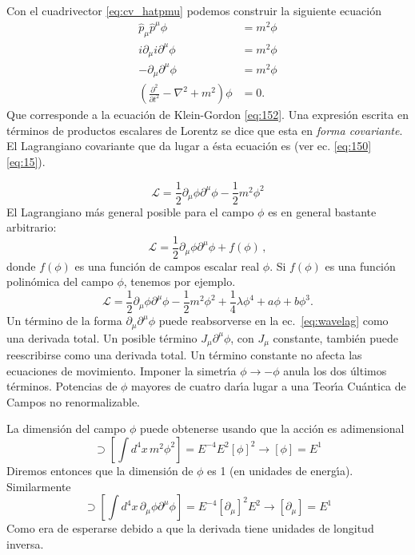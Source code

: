 Con el cuadrivector \eqref{eq:cv_hatpmu} podemos construir la
siguiente ecuaci\'on
\begin{align}
  \hat{p}_\mu\hat{p}^\mu\phi&=m^2\phi\nonumber\\
  i\partial_\mu i\partial^\mu\phi&=m^2\phi\nonumber\\
  -\partial_\mu\partial^\mu\phi&=m^2\phi\nonumber\\
  \label{eq:waveec}
  \left(\frac{\partial^2}{\partial t^2}-\nabla^2+m^2\right)\phi&=0.
\end{align}
Que corresponde a la ecuaci\'on de Klein-Gordon \eqref{eq:152}. Una expresi\'on escrita en t\'erminos de productos escalares de Lorentz se dice que esta en \emph{forma covariante}. El Lagrangiano covariante que da lugar a
\'esta ecuaci\'on es (ver ec. \eqref{eq:150}
\eqref{eq:15}). %

\begin{equation}
  \label{eq:wavelagtrue}
  \mathcal{L}=\frac{1}{2}\partial_\mu\phi\partial^\mu\phi-\frac{1}{2}m^2\phi^2
\end{equation}
El Lagrangiano m\'as general posible para el campo $\phi$ es en general bastante arbitrario:
\begin{equation}
  \mathcal{L}=\frac{1}{2}\partial_\mu\phi\partial^\mu\phi+f(\phi)\,,
\end{equation}
donde $f(\phi)$ es una función de campos escalar real $\phi$. Si $f(\phi)$ es una función polinómica del campo $\phi$, tenemos por ejemplo.
\begin{equation}
  \label{eq:wavelag}
  \mathcal{L}=\frac{1}{2}\partial_\mu\phi\partial^\mu\phi-\frac{1}{2}m^2\phi^2+\frac{1}{4}\lambda\phi^4+a\phi+b\phi^3.
\end{equation}
Un t\'ermino de la forma $\partial_\mu\partial^\mu\phi$ puede reabsorverse en la
ec.~\eqref{eq:wavelag} como una derivada total. Un posible t\'ermino
$J_\mu\partial^\mu\phi$, con $J_\mu$ constante, tambi\'en puede reescribirse como una
derivada total. Un t\'ermino constante
no afecta las ecuaciones de movimiento. Imponer la simetr\'\i a $\phi\to-\phi$
anula los dos \'ultimos t\'erminos. Potencias de $\phi$ mayores de cuatro
dar\'\i a lugar a una Teor\'\i a Cu\'antica de Campos no renormalizable. 

La dimensi\'on del campo $\phi$ puede obtenerse usando que la acci\'on es adimensional
\begin{equation}
  [S]\supset\left[\int d^4x\,m^2\phi^2\right]=E^{-4}E^2[\phi]^2\to [\phi]=E^1
\end{equation}
Diremos entonces que la dimensi\'on de $\phi$ es 1 (en unidades de energ\'\i a). Similarmente
\begin{equation}
  [S]\supset\left[\int d^4x\,\partial_\mu\phi\partial^\mu\phi\right]=E^{-4}[\partial_\mu]^2E^2\to [\partial_\mu]=E^1
\end{equation}
Como era de esperarse debido a que la derivada tiene unidades de longitud inversa.

